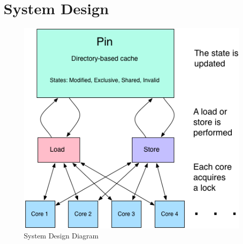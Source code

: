 \documentclass{article}
\begin{document}
\section{System Design}\label{sec:design}
\begin{figure}[H]
\begin{center}
\includegraphics[scale=0.5]{images/comp_arch_sd.png}
\end{center}
\caption{System Design Diagram}
\label{sysD}
\end{figure}
\end{document}
